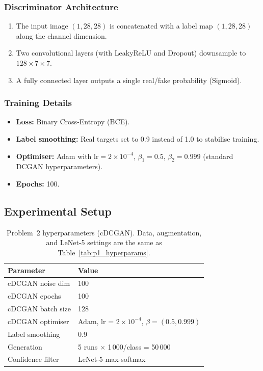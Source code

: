 \documentclass[12pt, a4paper]{article}
\renewcommand{\arraystretch}{1.12}
\begin{document}
\subsubsection{Discriminator Architecture}

\begin{enumerate}
    \item The input image $(1, 28, 28)$ is concatenated with a label map $(1, 28, 28)$ along
          the channel dimension.
    \item Two convolutional layers (with LeakyReLU and Dropout) downsample to
          $128 \times 7 \times 7$.
    \item A fully connected layer outputs a single real/fake probability (Sigmoid).
\end{enumerate}

\subsubsection{Training Details}

\begin{itemize}
    \item \textbf{Loss:} Binary Cross-Entropy (BCE).
    \item \textbf{Label smoothing:} Real targets set to 0.9 instead of 1.0 to stabilise training.
    \item \textbf{Optimiser:} Adam with $\text{lr} = 2 \times 10^{-4}$, $\beta_{1} = 0.5$,
          $\beta_{2} = 0.999$ (standard DCGAN hyperparameters).
    \item \textbf{Epochs:} 100.
\end{itemize}

\subsection{Experimental Setup}

\begin{table}[H]
\centering
\renewcommand{\arraystretch}{1.3}
\begin{tabular}{l l}
\toprule
\textbf{Parameter} & \textbf{Value} \\
\midrule
cDCGAN noise dim   & 100 \\
cDCGAN epochs      & 100 \\
cDCGAN batch size  & 128 \\
cDCGAN optimiser   & Adam, lr = $2 \times 10^{-4}$, $\beta = (0.5, 0.999)$ \\
Label smoothing    & 0.9 \\
\midrule
Generation         & 5 runs $\times$ 1\,000/class = 50\,000 \\
Confidence filter  & LeNet-5 max-softmax \\
\bottomrule
\end{tabular}
\caption{Problem~2 hyperparameters (cDCGAN). Data, augmentation, and LeNet-5
         settings are the same as Table~\ref{tab:p1_hyperparams}.}
\label{tab:p2_hyperparams}
\end{table}
\end{document}
